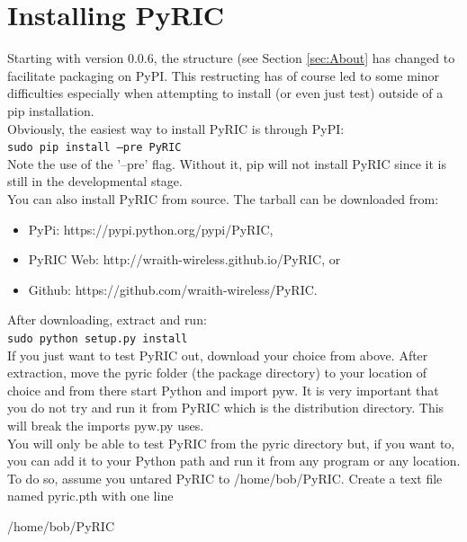 \documentclass[11pt]{article}
\begin{document}
\section{Installing PyRIC}\label{sec:installing}
Starting with version 0.0.6, the structure (see Section \ref{sec:About} has 
changed to facilitate packaging on PyPI. This restructing has of course led 
to some minor difficulties especially when attempting to install (or even 
just test) outside of a pip installation. \\

Obviously, the easiest way to install PyRIC is through PyPI:\\

    \texttt{sudo pip install --pre PyRIC}\\

Note the use of the '--pre' flag. Without it, pip will not install PyRIC since
it is still in the developmental stage.\\

You can also install PyRIC from source. The tarball can be downloaded from:

\begin{itemize}
\item PyPi: https://pypi.python.org/pypi/PyRIC,
\item PyRIC Web: http://wraith-wireless.github.io/PyRIC, or
\item Github: https://github.com/wraith-wireless/PyRIC.
\end{itemize}

After downloading, extract and run:\\

	\texttt{sudo python setup.py install}\\

If you just want to test PyRIC out, download your choice from above. After 
extraction, move the pyric folder (the package directory) to your location of 
choice and from there start Python and import pyw. It is very important that you
do not try and run it from PyRIC which is the distribution directory. This will 
break the imports pyw.py uses. \\

You will only be able to test PyRIC from the pyric directory but, if you want to,
you can add it to your Python path and run it from any program or any location.
To do so, assume you untared PyRIC to /home/bob/PyRIC. Create a text file named
pyric.pth with one line

    /home/bob/PyRIC
\end{document}
